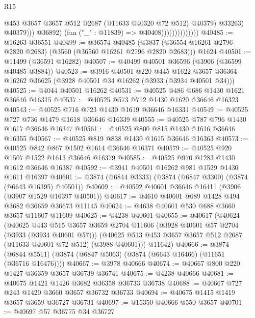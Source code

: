 \begin{lexlean}{R15}
\begin{coremodule}
                                          @453
                                          @3657
                                          @3657
                                          @512
                                          @2687
                                          (@11633 @40320 @72 @512)
                                          @40379)
                                        @33263)
                                      @40379)))
                                @36892)
                              (fun ("_" : @11839) => @40408))))))))))))))
@40485 := @16263 @36551
@40499 := @36574
    @40485
    (@3837 (@36554 @16261 @2796 @2820 @2683) (@3560 (@36560 @16261 @2796 @2820 @2683)))
    @1624
@40501 := @11499 (@36591 @16282)
@40507 := @40499 @40501 @36596 (@3906 (@36599 @40485 @3884))
@40523 := @3916
    @40501
    @220
    @445
    @1622
    @3657
    @36364
    @16262
    @36625
    (@3928 @40501 @34 @16262 (@3933 (@3934 @40501 @34)))
@40525 := @4044 @40501 @16262
@40531 := @40525 @486 @686 @1430 @1621 @36646 @16315
@40537 := @40525 @573 @712 @1430 @1620 @36646 @16323
@40543 := @40525 @716 @723 @1430 @1619 @36646 @16331
@40549 := @40525 @727 @736 @1479 @1618 @36646 @16339
@40555 := @40525 @787 @796 @1430 @1617 @36646 @16347
@40561 := @40525 @800 @815 @1430 @1616 @36646 @16355
@40567 := @40525 @819 @838 @1430 @1615 @36646 @16363
@40573 := @40525 @842 @867 @1502 @1614 @36646 @16371
@40579 := @40525 @920 @1507 @1522 @1613 @36646 @16379
@40585 := @40525 @970 @1283 @1430 @1612 @36646 @16387
@40592 := @3941 @40501 @16262 @981 @1529 @1430 @1611 @16397
@40601 := @3874 (@6844 @3333) (@3874 (@6847 @3300) (@3874 (@6643 @16395) @40501))
@40609 := @40592 @40601 @36646 @16411 (@3906 (@3907 @1529 @16397 @40501))
@40617 := @4610 @40601 @689 @1428 @494 @3682 @36659 @36673 @11145
@40624 := @4638 @40601 @530 @688 @3660 @3657 @11607 @11609
@40625 := @4238 @40601
@40655 := @40617
    (@40624
      (@40625
        @443
        @515
        @3657
        @3659
        @2704
        @11606
        (@3928 @40601 @57 @2704 (@3933 (@3934 @40601 @57)))
        (@40625 @513 @453 @3657 @3657 @512 @2687 (@11633 @40601 @72 @512) (@3988 @40601)))
      @11642)
@40666 := @3874 (@6844 @5511) (@3874 (@6847 @5063) (@3874 (@6643 @16466) (@11651 (@36716 @16476))))
@40667 := @3978 @40666
@40674 := @40667 @800 @220 @1427 @36359 @3657 @36739 @36741
@40675 := @4238 @40666
@40681 := @40675 @1421 @1426 @3682 @36358 @36733 @36738
@40688 := @40667 @727 @243 @1420 @3660 @3657 @36732 @36733
@40694 := @40675 @1415 @1419 @3657 @3659 @36727 @36731
@40697 := @15350 @40666 @550 @3657
@40701 := @40697 @57 @36775 @34 @36727

\end{coremodule}
\end{lexlean}
